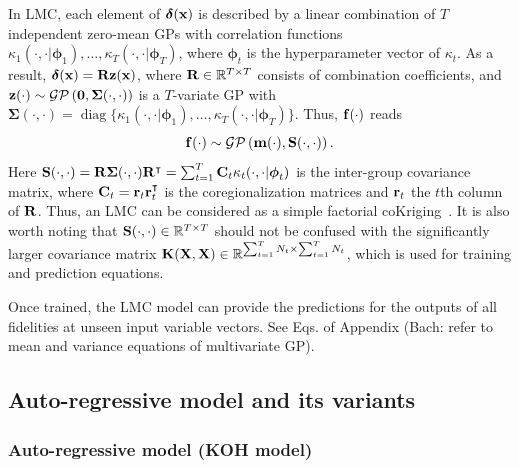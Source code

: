 \documentclass[iicol,sn-basic]{sn-jnl}%
\theoremstyle{thmstyleone}%
\theoremstyle{thmstyletwo}
\theoremstyle{thmstylethree}
\newcommand\myNote[1]{\textcolor{red!50!black}{(Bach: #1})}
\DeclareMathOperator{\diag}{diag}
\begin{document}
\begin{linenumbers}
In LMC, each element of ${\boldsymbol \delta}({\bf x})$ is described by a linear combination of $T$ independent zero-mean GPs with correlation functions $\kappa_1(\cdot,\cdot|{\boldsymbol \phi}_1),\dots,\kappa_T(\cdot,\cdot|{\boldsymbol \phi}_T)$, where ${\boldsymbol \phi}_t$ is the hyperparameter vector of $\kappa_t$.
As a result, ${\boldsymbol \delta}({\bf x}) = {\bf R} {\bf z}({\bf x})$, where ${\bf R} \in \mathbb{R}^{T \times T}$ consists of combination coefficients, and ${\bf z}(\cdot) \sim \mathcal{GP}\left({\bf 0},{\boldsymbol \Sigma}(\cdot,\cdot)\right)$ is a $T$-variate GP with ${\boldsymbol \Sigma}(\cdot,\cdot) = \diag\{\kappa_1(\cdot,\cdot|{\boldsymbol \phi}_1),\dots,\kappa_T(\cdot,\cdot|{\boldsymbol \phi}_T)\}$.
Thus, ${\bf f}(\cdot)$ reads
\begin{equation}\label{Eq4}
	{\bf f}(\cdot) \sim \mathcal{GP}\left({\bf m}(\cdot),{\bf S}(\cdot,\cdot)\right).
\end{equation}
Here 
${\bf S}(\cdot,\cdot) = {\bf R} {\boldsymbol \Sigma}(\cdot,\cdot) {\bf R}^\intercal = \sum_{t=1}^T {\bf C}_t \kappa_t(\cdot,\cdot|{\boldsymbol \phi}_t)$ is the inter-group covariance matrix, where ${\bf C}_t = {\bf r}_t {\bf r}_t^\intercal$ is the coregionalization matrices and ${\bf r}_t$ the $t$th column of ${\bf R}$.
Thus, an LMC can be considered as a simple factorial coKriging~\citep{Chiles1999}. 
It is also worth noting that ${\bf S}(\cdot,\cdot) \in \mathbb{R}^{T \times T}$ should not be confused with the significantly larger covariance matrix ${\bf K}({\bf X},{\bf X}) \in \mathbb{R}^{\sum_{t=1}^{T}N_t \times \sum_{t=1}^{T}N_t}$, which is used for training and prediction equations.

Once trained, the LMC model can provide the predictions for the outputs of all fidelities at unseen input variable vectors.
See Eqs. of Appendix \myNote{refer to mean and variance equations of multivariate GP}.

\subsection{Auto-regressive model and its variants}\label{Sec52}
\subsubsection{Auto-regressive model (KOH model)}\label{Sec521}


\end{linenumbers}
\end{document}
